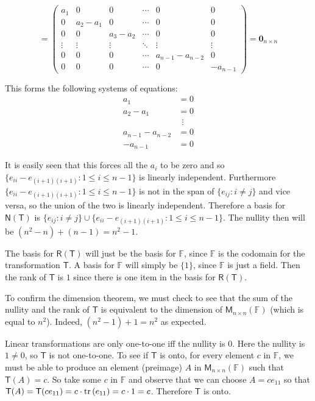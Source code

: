 \documentclass[11pt]{article}
\newcommand{\br}[1]{\left(#1\right)}
\newcommand{\cbr}[1]{\{#1\}}
\begin{document}
$$= \begin{pmatrix}
    a_1 & 0 & 0 & \cdots & 0 & 0 \\
    0 & a_2 - a_1 & 0 & \cdots & 0 & 0 \\
    0 & 0 & a_3 - a_2 & \cdots & 0 & 0 \\
    \vdots & \vdots & \vdots & \ddots & \vdots & \vdots \\
    0 & 0 & 0 & \cdots & a_{n-1} - a_{n-2} & 0 \\
    0 & 0 & 0 & \cdots & 0 & -a_{n-1}
\end{pmatrix} = \mathbf{0}_{n\times n}$$

This forms the following systems of equations:
\begin{align*}
    a_1 &= 0 \\
    a_2-a_1 &= 0\\
    &~~\vdots\\
    a_{n-1}-a_{n-2} &= 0\\
    -a_{n-1} &= 0
\end{align*}

It is easily seen that this forces all the $a_i$ to be zero and so $\cbr{e_{ii} - e_{(i+1)(i+1)} : 1 \leq i \leq n-1}$ is linearly independent. Furthermore $\cbr{e_{ii} - e_{(i+1)(i+1)} : 1 \leq i \leq n-1}$ is not in the span of $\cbr{e_{ij} : i\neq j}$ and vice versa, so the union of the two is linearly independent. Therefore a basis for $\mathsf{N(T)}$ is $\cbr{e_{ij} : i\neq j} \cup \cbr{e_{ii} - e_{(i+1)(i+1)} : 1 \leq i \leq n-1}$. The nullity then will be $\br{n^2-n} + \br{n-1} = n^2 - 1$.

The basis for $\mathsf{R(T)}$ will just be the basis for $\mathbb{F}$, since $\mathbb{F}$ is the codomain for the transformation $\mathsf{T}$. A basis for $\mathbb{F}$ will simply be $\cbr{1}$, since $\mathbb{F}$ is just a field. Then the rank of $\mathsf{T}$ is $1$ since there is one item in the basis for $\mathsf{R(T)}$.

To confirm the dimension theorem, we must check to see that the sum of the nullity and the rank of $\mathsf{T}$ is equivalent to the dimension of $\mathsf{M}_{n\times n}(\mathbb{F})$ (which is equal to $n^2$). Indeed, $\br{n^2-1} + 1 = n^2$ as expected. 

Linear transformations are only one-to-one iff the nullity is $0$. Here the nullity is $1 \neq 0$, so $\mathsf{T}$ is not one-to-one. To see if $\mathsf{T}$ is onto, for every element $c$ in $\mathbb{F}$, we must be able to produce an element (preimage) $A$ in $\mathsf{M}_{n\times n}(\mathbb{F})$ such that $\mathsf{T}(A) = c$. So take some $c$ in $\mathbb{F}$ and observe that we can choose $A = ce_{11}$ so that $\mathsf{T}(A) = \mathsf{T}(ce_{11}) = c\cdot \trace\br{e_{11}} = c\cdot 1 = c$. Therefore $\mathsf{T}$ is onto.
\end{document}
